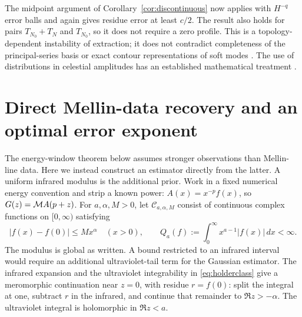The midpoint argument of Corollary~\ref{cor:discontinuous} now applies
with $H^{-q}$ error balls and again gives residue error at least $c/2$.
The result also holds for pairs $T_{N_0}+T_N$ and $T_{N_0}$, so it does
not require a zero profile. This is a topology-dependent instability of
extraction; it does not contradict completeness of the principal-series
basis or exact contour representations of soft modes
\cite{basis,asymptotic}. The use of distributions in celestial amplitudes
has an established mathematical treatment \cite{distributional}.

\section{Direct Mellin-data recovery and an optimal error exponent}
\label{sec:direct}
The energy-window theorem below assumes stronger observations than
Mellin-line data. Here we instead construct an estimator directly from
the latter. A uniform infrared modulus is the additional prior.
Work in a fixed numerical energy convention and strip a known power:
$A(x)=x^{-p}f(x)$, so $G(z)=\mathcal M A(p+z)$.
For $a,\alpha,M>0$, let $\mathcal C_{a,\alpha,M}$ consist of continuous
complex functions on $[0,\infty)$ satisfying
\begin{equation}\label{eq:holderclass}
 |f(x)-f(0)|\le Mx^\alpha\quad(x>0),\qquad
 Q_a(f):=\int_0^\infty x^{a-1}|f(x)|\,dx<\infty.
\end{equation}
The modulus is global as written. A bound restricted to an infrared
interval would require an additional ultraviolet-tail term for the
Gaussian estimator. The infrared expansion and the ultraviolet
integrability in \eqref{eq:holderclass} give a meromorphic continuation
near $z=0$, with residue $r=f(0)$: split the integral at one, subtract
$r$ in the infrared, and continue that remainder to $\Re z>-\alpha$.
The ultraviolet integral is holomorphic in $\Re z<a$.

